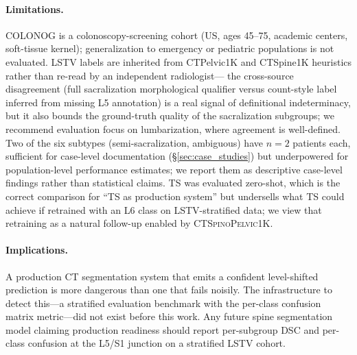 \documentclass{article}
\newcommand{\dataset}{\textsc{CTSpinoPelvic1K}}
\begin{document}
\paragraph{Limitations.}
COLONOG is a colonoscopy-screening cohort (US, ages 45--75,
academic centers, soft-tissue kernel); generalization to emergency
or pediatric populations is not evaluated.
LSTV labels are inherited from CTPelvic1K and CTSpine1K
heuristics rather than re-read by an independent radiologist---
the cross-source disagreement (full sacralization morphological
qualifier versus count-style label inferred from missing L5
annotation) is a real signal of definitional indeterminacy, but
it also bounds the ground-truth quality of the sacralization
subgroups; we recommend evaluation focus on lumbarization, where
agreement is well-defined.
Two of the six subtypes (semi-sacralization, ambiguous) have
$n=2$ patients each, sufficient for case-level documentation
(\S\ref{sec:case_studies}) but underpowered for population-level
performance estimates; we report them as descriptive case-level
findings rather than statistical claims.
TS was evaluated zero-shot, which is the correct comparison for
``TS as production system'' but undersells what TS could achieve
if retrained with an L6 class on LSTV-stratified data;
we view that retraining as a natural follow-up enabled by
\dataset{}.

\paragraph{Implications.}
A production CT segmentation system that emits a confident
level-shifted prediction is more dangerous than one that fails
noisily.
The infrastructure to detect this---a stratified evaluation
benchmark with the per-class confusion matrix metric---did not
exist before this work.
Any future spine segmentation model claiming production readiness
should report per-subgroup DSC and per-class confusion at the
L5/S1 junction on a stratified LSTV cohort.



\end{document}
